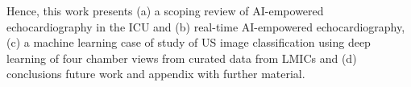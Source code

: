 \documentclass[mlabstract,twocolumn]{jmlr}
\begin{document}
Hence, this work presents (a) a scoping review of AI-empowered echocardiography in the ICU and (b) real-time AI-empowered echocardiography, (c) a machine learning case of study of US image classification using deep learning of four chamber views from curated data from LMICs and (d) conclusions future work and appendix with further material.




\end{document}
